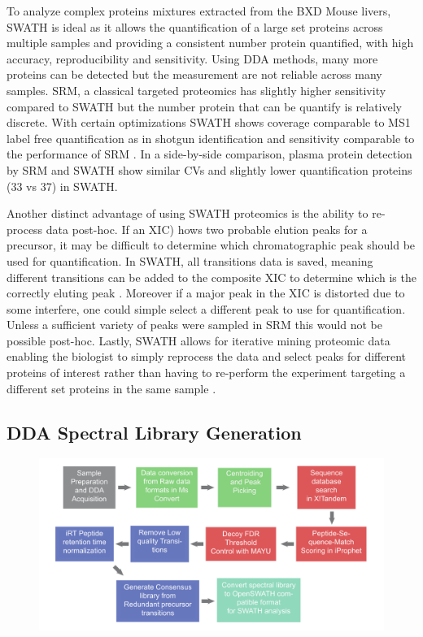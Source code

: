 \documentclass[a4paper]{book}
\begin{document}
	To analyze complex proteins mixtures extracted from the BXD Mouse livers, SWATH is ideal as it allows the quantification of a large set proteins across multiple samples and providing a consistent number protein quantified, with high accuracy, reproducibility and sensitivity. Using DDA methods, many more proteins can be detected but the measurement are not reliable across many samples. SRM, a classical targeted proteomics has slightly higher sensitivity compared to SWATH but the number protein that can be quantify is relatively discrete. With certain optimizations SWATH shows coverage comparable to MS1 label free quantification as in shotgun identification and sensitivity comparable to the performance of SRM \citep{Liu2013QuantitativeSWATH-MS}. In a side-by-side comparison, plasma protein detection by SRM and SWATH \citep{Liu2013QuantitativeSWATH-MS} show similar CVs and slightly lower quantification proteins (33 vs 37) in SWATH. 
	
	Another distinct advantage of using SWATH proteomics is the ability to re-process data post-hoc. If an XIC) hows two probable elution peaks for a precursor, it may be difficult to determine which chromatographic peak should be used for quantification. In SWATH, all transitions data is saved, meaning different transitions can be added to the composite XIC to determine which is the correctly eluting peak \citep{Gillet2012TargetedAnalysis}. Moreover if a major peak in the XIC is distorted due to some interfere, one could simple select a different peak to use for quantification. Unless a sufficient variety of peaks were sampled in SRM this would not be possible post-hoc\citep{Gillet2012TargetedAnalysis}. Lastly, SWATH allows for iterative mining proteomic data enabling the biologist to simply reprocess the data and select peaks for different proteins of interest rather than having to re-perform the experiment targeting a different set proteins in the same sample \citep{Gillet2012TargetedAnalysis}.
	
	
	
	
	\subsection{DDA Spectral Library Generation}
	
	\begin{figure}[ht]
		\centering
		\includegraphics[width=\linewidth]{3.Proteomics/Spectral_Library_Gen.pdf}
		\label{Spectral Library Generation Road Map}
	\end{figure}
	
\end{document}
